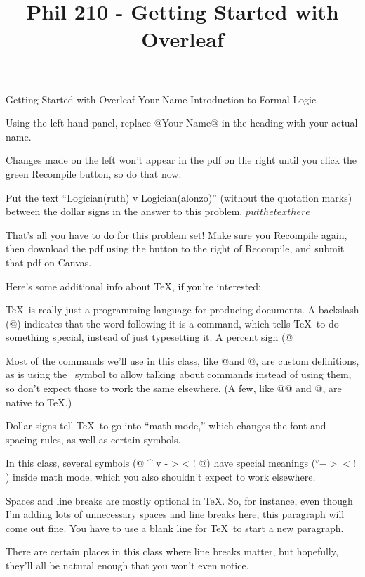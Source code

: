 
\title{Phil 210 - Getting Started with Overleaf}

\heading
Getting Started with Overleaf
Your Name
Introduction to Formal Logic
\endheading

\problems
{}
Using the left-hand panel, replace @Your Name@ in the heading with your actual name.

Changes made on the left won't appear in the pdf on the right until you click the green Recompile button, so do that now.

Put the text ``Logician(ruth) v Logician(alonzo)'' (without the quotation marks) between the dollar signs in the answer to this problem.
	\answer
	$ put the text here $
	\endanswer

That's all you have to do for this problem set! Make sure you Recompile again, then download the pdf using the button to the right of Recompile, and submit that pdf on Canvas.

\endproblems


Here's some additional info about \TeX, if you're interested:

\parskip\baselineskip \parindent\problemindent

\TeX\ is really just a programming language for producing documents. A backslash (@\@) indicates that the word following it is a command, which tells \TeX\ to do something special, instead of just typesetting it. A percent sign (@%

Most of the commands we'll use in this class, like @\heading@ and @\endanswer@, are custom definitions, as is using the \at\ symbol to allow talking about commands instead of using them, so don't expect those to work the same elsewhere. (A few, like @@ and @\TeX@, are native to \TeX.)

Dollar signs tell \TeX\ to go into ``math mode,'' which changes the font and spacing rules, as well as certain symbols.

In this class, several symbols (@ ^ v - > < ! @) have special meanings ($ ^ v - > < ! $) inside math mode, which you also shouldn't expect to work elsewhere.

Spaces and line breaks are mostly optional in \TeX. So, for instance,
even though
I'm adding   lots   of unnecessary spaces  and line
breaks
here, this paragraph   will come out  fine. You have    to use a blank line for \TeX\ to start a new paragraph.

There are certain places in this class where line breaks matter, but hopefully, they'll all be natural enough that you won't even notice.
\bye
